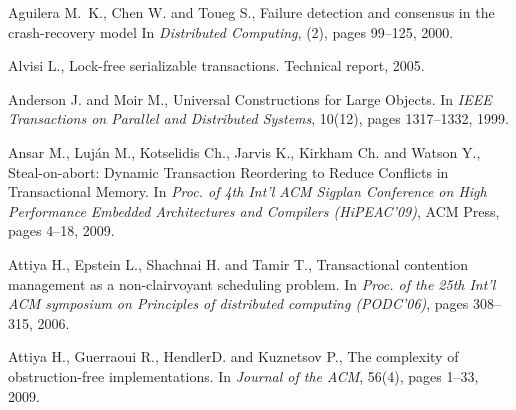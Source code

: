 \begin{thebibliography}{99}
{%


Aguilera M.~K., Chen W. and Toueg S.,
\newblock Failure detection and consensus in the crash-recovery model
\newblock In {\it Distributed Computing},
(2), pages 99--125, 2000.

Alvisi L.,
\newblock Lock-free serializable transactions.
\newblock Technical report, 2005.



Anderson J. and Moir M., 
Universal Constructions for Large Objects. 
In {\it  IEEE Transactions on Parallel and Distributed  Systems},
10(12), pages 1317--1332,  1999.



Ansar M.,  Luj\'an M.,  Kotselidis Ch., Jarvis K.,  Kirkham Ch. 
and  Watson Y., 
Steal-on-abort: Dynamic Transaction Reordering to
Reduce Conflicts in Transactional Memory. 
In {\it Proc. of 4th  Int'l ACM Sigplan Conference on  High Performance Embedded  
Architectures and Compilers (HiPEAC'09)}, ACM Press,  pages 4--18, 2009.






Attiya H., Epstein L., Shachnai H. and Tamir T.,
\newblock Transactional contention management as a non-clairvoyant scheduling
  problem.
\newblock In {\em Proc. of the 25th Int'l ACM
  symposium on Principles of distributed computing (PODC'06)}, pages 308--315, 2006.

Attiya H., Guerraoui R., HendlerD. and Kuznetsov P.,
\newblock The complexity of obstruction-free implementations.
\newblock In {\em Journal of the ACM}, 56(4), pages 1--33, 2009.


}
\end{thebibliography}
